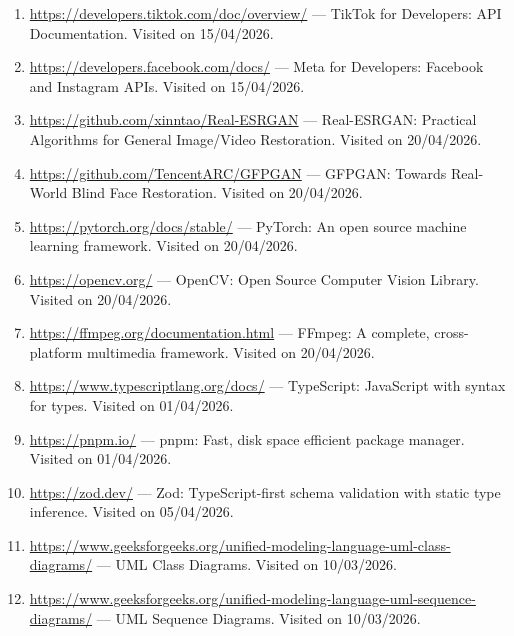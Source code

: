\begin{enumerate}
    \item \url{https://developers.tiktok.com/doc/overview/} --- TikTok for Developers: API Documentation. Visited on 15/04/2026.
    
    \item \url{https://developers.facebook.com/docs/} --- Meta for Developers: Facebook and Instagram APIs. Visited on 15/04/2026.
    
    \item \url{https://github.com/xinntao/Real-ESRGAN} --- Real-ESRGAN: Practical Algorithms for General Image/Video Restoration. Visited on 20/04/2026.
    
    \item \url{https://github.com/TencentARC/GFPGAN} --- GFPGAN: Towards Real-World Blind Face Restoration. Visited on 20/04/2026.
    
    \item \url{https://pytorch.org/docs/stable/} --- PyTorch: An open source machine learning framework. Visited on 20/04/2026.
    
    \item \url{https://opencv.org/} --- OpenCV: Open Source Computer Vision Library. Visited on 20/04/2026.
    
    \item \url{https://ffmpeg.org/documentation.html} --- FFmpeg: A complete, cross-platform multimedia framework. Visited on 20/04/2026.
    
    \item \url{https://www.typescriptlang.org/docs/} --- TypeScript: JavaScript with syntax for types. Visited on 01/04/2026.
    
    \item \url{https://pnpm.io/} --- pnpm: Fast, disk space efficient package manager. Visited on 01/04/2026.
    
    \item \url{https://zod.dev/} --- Zod: TypeScript-first schema validation with static type inference. Visited on 05/04/2026.
    
    \item \url{https://www.geeksforgeeks.org/unified-modeling-language-uml-class-diagrams/} --- UML Class Diagrams. Visited on 10/03/2026.
    
    \item \url{https://www.geeksforgeeks.org/unified-modeling-language-uml-sequence-diagrams/} --- UML Sequence Diagrams. Visited on 10/03/2026.
\end{enumerate}
